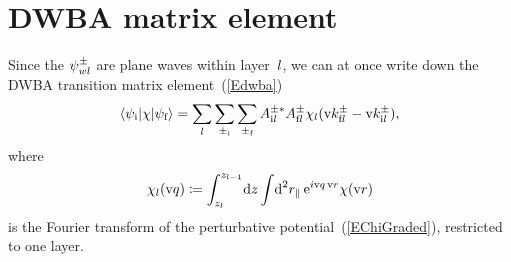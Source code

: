 \section{DWBA matrix element}

Since the $\psi^\pm_{wl}$ are plane waves within layer~$l$,
we can at once write down the DWBA transition matrix element~(\ref{Edwba})
%
\begin{equation}\label{Edwba_ml0}
  \left\langle \psi_{\text{i}}|\chi|\psi_{\text{f}}\right\rangle
  = \sum_{l} \sum_{\pm_{\text{i}}} \sum_{\pm_{\text{f}}}
    A^{\pm *}_{\text{i} l} A^\pm_{\text{f} l}
     \chi_l(\text{v}{k}^\pm_{\text{f} l}-\text{v}{k}^\pm_{\text{i} l}),
\end{equation}
where
\begin{equation}\label{Echij}
  \chi_l(\text{v}{q})
  \coloneqq  \int_{z_l}^{z_{l-1}}\!\text{d} z \int\!\text{d}^2r_\parallel\, \text{e}^{i\text{v}{q}\,\text{v}{r}}\chi(\text{v}{r})
\end{equation}
%
is the Fourier transform
of the perturbative potential~(\ref{EChiGraded}),
restricted to one layer.

